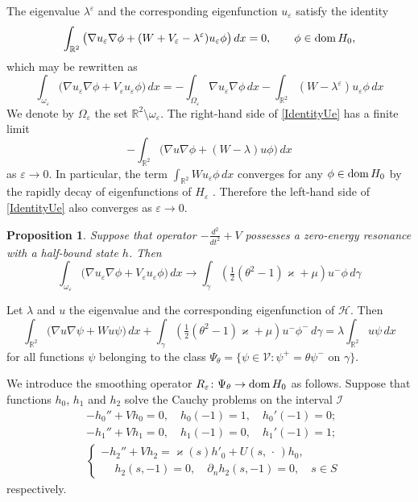 \documentclass[reqno]{amsart}
\theoremstyle{plain}
\newtheorem{prop}{Proposition}
\numberwithin{equation}{section}
\newcommand{\dom}{\mathop{\rm dom}}
\renewcommand{\kappa}{\varkappa}
\newcommand{\Real}{\mathbb R}
\newcommand{\eps}{\varepsilon}
\newcommand{\cI}{\mathcal{I}}
\newcommand{\cH}{\mathcal{H}}
\newcommand{\cV}{\mathcal{V}}
\begin{document}
The eigenvalue $\lambda^\eps$ and the corresponding eigenfunction $u_\eps$ satisfy the identity
\begin{equation*}
   \int_{\Real^2}\big(\nabla u_\eps \nabla \phi+
              (W+V_\eps-\lambda^\eps)u_\eps \phi\big)\,dx=0, \qquad \phi\in \dom H_0,
\end{equation*}
which may be rewritten as
\begin{equation}\label{IdentityUe}
   \int_{\omega_\eps}\big(\nabla u_\eps \nabla \phi+
   V_\eps u_\eps \phi\big)\,dx=
    -\int_{\Omega_\eps}\nabla u_\eps \nabla \phi\,dx- \int_{\Real^2}
              (W-\lambda^\eps)u_\eps \phi\,dx
\end{equation}
We denote by $\Omega_\eps$ the set $\Real^2\setminus\omega_\eps$. The right-hand side of \eqref{IdentityUe} has a finite limit
\begin{equation*}
  -\int_{\Real^2}\big(\nabla u \nabla \phi+
              (W-\lambda)u \phi\big)\,dx
\end{equation*}
as $\eps\to 0$. In particular, the term $\int_{\Real^2}Wu_\eps \phi\,dx$ converges  for any  $\phi\in \dom H_0$ by the rapidly decay of  eigenfunctions of $H_\eps$ \cite[Ch.3.3]{BerezinShubinBook}. Therefore the left-hand side of \eqref{IdentityUe} also converges as $\eps\to 0$.

\begin{prop}
  Suppose that operator $-\frac{d^2}{d t^2}+V$ possesses a zero-energy resonance with a half-bound state $h$. Then
  \begin{equation*}
    \int_{\omega_\eps}\big(\nabla u_\eps \nabla \phi+
   V_\eps u_\eps \phi\big)\,dx\to
\int_\gamma\left(\tfrac12(\theta^2-1)\kappa+\mu\right) u^-\phi\,d\gamma
  \end{equation*}
\end{prop}


Let $\lambda$ and $u$ the eigenvalue and the corresponding eigenfunction of
 $\cH$. Then
\begin{equation*}
   \int_{\Real^2}\big(\nabla u \nabla \psi+Wu\psi\big)\,dx
   +\int_\gamma\left(\tfrac12(\theta^2-1)\kappa+\mu\right) u^-\phi^-\,d\gamma=\lambda\int_{\Real^2}u \psi\,dx
\end{equation*}
for all functions $\psi$ belonging to the class $\Psi_\theta=\{\psi\in\cV\colon \psi^+=\theta \psi^-\text{ on }\gamma\}$.

We introduce the smoothing operator $R_\eps\colon \Psi_\theta\to \dom H_0$
as follows. Suppose that functions $h_0$, $h_1$ and $h_2$ solve the Cauchy problems on the interval $\cI$
\begin{align*}
&-h_0''+Vh_0=0,\quad  h_0(-1)=1, \quad h_0'(-1)=0;
\\
&-h_1''+Vh_1=0,\quad  h_1(-1)=0, \quad h_1'(-1)=1;
\\
&\begin{cases}
  -h_2''+Vh_2=\kappa(s)h'_0+U(s,\,\cdot\,)h_0,
  \\
\phantom{-}h_2(s,-1)=0, \quad \partial_n h_2(s,-1)=0,\quad s\in S
\end{cases}
\end{align*}
respectively.
\end{document}

